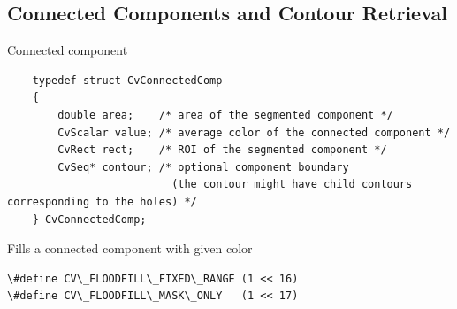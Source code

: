 \subsection{Connected Components and Contour Retrieval}

\label{CvConnectedComp}

Connected component

\begin{lstlisting}
    typedef struct CvConnectedComp
    {
        double area;    /* area of the segmented component */
        CvScalar value; /* average color of the connected component */
        CvRect rect;    /* ROI of the segmented component */
        CvSeq* contour; /* optional component boundary
                          (the contour might have child contours corresponding to the holes) */
    } CvConnectedComp;

\end{lstlisting}

\label{FloodFill}

Fills a connected component with given color


\begin{lstlisting}
\#define CV\_FLOODFILL\_FIXED\_RANGE (1 << 16)
\#define CV\_FLOODFILL\_MASK\_ONLY   (1 << 17)
\end{lstlisting}

